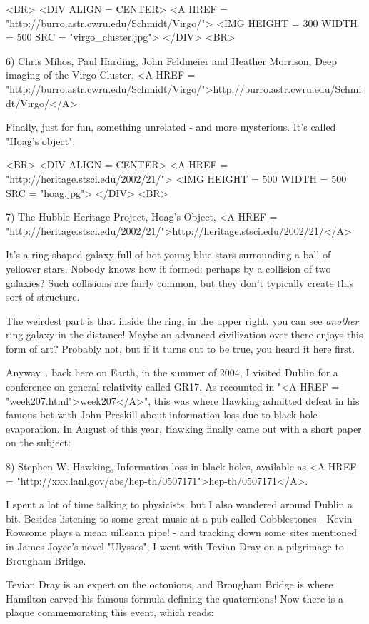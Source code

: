 <BR>
<DIV ALIGN = CENTER>
<A HREF = "http://burro.astr.cwru.edu/Schmidt/Virgo/">
<IMG HEIGHT = 300 WIDTH = 500 SRC = "virgo_cluster.jpg">
</DIV>
<BR>

6) Chris Mihos, Paul Harding, John Feldmeier and Heather Morrison,
Deep imaging of the Virgo Cluster, <A HREF = "http://burro.astr.cwru.edu/Schmidt/Virgo/">http://burro.astr.cwru.edu/Schmidt/Virgo/</A>

Finally, just for fun, something unrelated - and more mysterious.  It's 
called "Hoag's object":

<BR>
<DIV ALIGN = CENTER>
<A HREF = "http://heritage.stsci.edu/2002/21/">
<IMG HEIGHT = 500 WIDTH = 500 SRC = "hoag.jpg">
</DIV>
<BR>

7) The Hubble Heritage Project, Hoag's Object, 
<A HREF = "http://heritage.stsci.edu/2002/21/">http://heritage.stsci.edu/2002/21/</A>

It's a ring-shaped galaxy full of hot young blue stars surrounding a ball 
of yellower stars.  Nobody knows how it formed: perhaps by a collision
of two galaxies?  Such collisions are fairly common, but they don't 
typically create this sort of structure.  

The weirdest part is that
inside the ring, in the upper right, you can see \emph{another} ring galaxy 
in the distance! 
Maybe an advanced civilization over there enjoys this form of art?
Probably not, but if it turns out to be true, you heard it here first.

Anyway... back here on Earth, in the summer of 2004, I visited Dublin for a 
conference on general relativity called GR17.  As recounted in "<A HREF = "week207.html">week207</A>", 
this was where Hawking admitted defeat in his famous bet with John Preskill 
about information loss due to black hole evaporation.  In August of this 
year, Hawking finally came out with a short paper on the subject:

8) Stephen W. Hawking, Information loss in black holes, available as
<A HREF = "http://xxx.lanl.gov/abs/hep-th/0507171">hep-th/0507171</A>.

I spent a lot of time talking to physicists, but I also wandered around 
Dublin a bit.  Besides listening to some great music at a pub called 
Cobblestones - Kevin Rowsome plays a mean uilleann pipe! - and tracking 
down some sites mentioned in James Joyce's novel "Ulysses", I went with 
Tevian Dray on a pilgrimage to Brougham Bridge.  

Tevian Dray is an expert on the octonions, and Brougham Bridge is where 
Hamilton carved his famous formula defining the quaternions!  Now there 
is a plaque commemorating this event, which reads:

